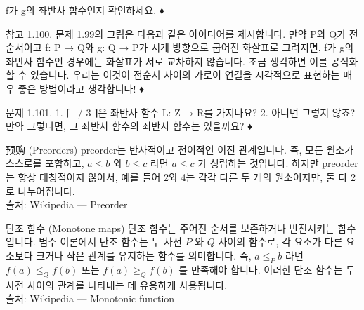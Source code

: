 \documentclass[11pt, a4paper, twoside, openany]{book}
\begin{document}
\par\medskip
f\hspace{0pt}가 g\hspace{0pt}의 좌반사 함수인지 확인하세요.
♦

\par\medskip
참고 1.100. 문제 1.99\hspace{0pt}의 그림은 다음과 같은 아이디어를 제시합니다. 만약 P\hspace{0pt}와 Q\hspace{0pt}가 전순서이고 f: P → Q\hspace{0pt}와 g: Q → P\hspace{0pt}가 시계 방향으로 굽어진 화살표로 그려지면, f\hspace{0pt}가 g\hspace{0pt}의 좌반사 함수인 경우에는 화살표가 서로 교차하지 않습니다. 조금 생각하면 이를 공식화할 수 있습니다. 우리는 이것이 전순서 사이의 가로이 연결을 시각적으로 표현하는 매우 좋은 방법이라고 생각합니다!
♦

\par\medskip
문제 1.101.
1. ⌈−/ 3 ⌉은 좌반사 함수 L: Z → R\hspace{0pt}를 가지나요?
2. 아니면 그렇지 않죠? 만약 그렇다면, 그 좌반사 함수의 좌반사 함수는 있을까요?
♦

\begin{deepresearch}{预购 (Preorders) }
preorder\hspace{0pt}는 반사적이고 전이적인 이진 관계입니다.  즉, 모든 원소가 스스로를 포함하고, $a \le b$ 와 $b \le c$ 라면 $a \le c$ 가 성립하는 것입니다. 하지만 preorder\hspace{0pt}는 항상 대칭적이지 않아서, 예를 들어 2\hspace{0pt}와 4\hspace{0pt}는 각각 다른 두 개의 원소이지만, 둘 다 2\hspace{0pt}로 나누어집니다.
\\[4pt]{\footnotesize\color{ctgray} 출처: Wikipedia — Preorder}
\end{deepresearch}

\begin{deepresearch}{단조 함수 (Monotone maps)}
단조 함수는 주어진 순서를 보존하거나 반전시키는 함수입니다.  범주 이론에서 단조 함수는 두 사전 $P$ 와 $Q$ 사이의 함수로, 각 요소가 다른 요소보다 크거나 작은 관계를 유지하는 함수를 의미합니다. 즉, $a \le_P b$ 라면 $f(a) \le_Q f(b)$ 또는 $f(a) \ge_Q f(b)$ 를 만족해야 합니다. 이러한 단조 함수는 두 사전 사이의 관계를 나타내는 데 유용하게 사용됩니다.
\\[4pt]{\footnotesize\color{ctgray} 출처: Wikipedia — Monotonic function}
\end{deepresearch}
\end{document}
